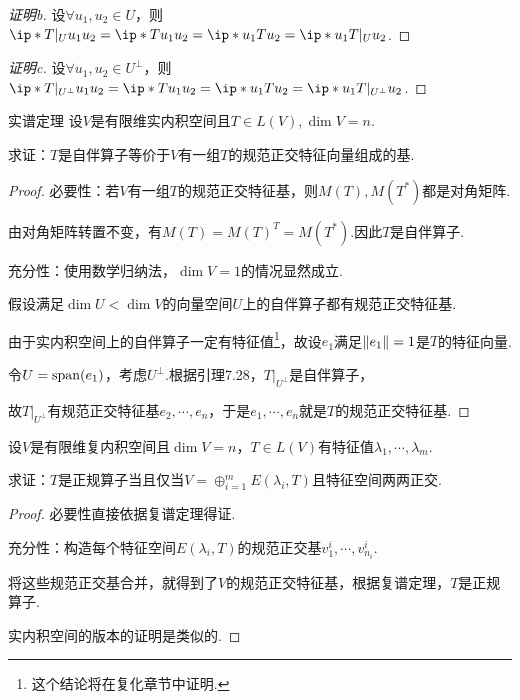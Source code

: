 \begin{proof}[证明b]
    设\(\forall u_1,u_2 \in U\)，则\(\ip*{T|_U u_1}{u_2}=\ip*{Tu_1}{u_2}=\ip*{u_1}{Tu_2}=\ip*{u_1}{T|_U u_2}\).
\end{proof}

\begin{proof}[证明c]
    设\(\forall u_1,u_2 \in U^\bot\)，则\(\ip*{T|_{U^\bot}u_1}{u_2}=\ip*{Tu_1}{u_2}=\ip*{u_1}{Tu_2}=\ip*{u_1}{T|_{U^\bot}u_2}\).
\end{proof}

\begin{theorem}[7.29]\label{thm 7.29} 实谱定理 \:
    设\(V\)是有限维实内积空间且\(T \in L(V),\dim V=n\).

    求证：\(T\)是自伴算子等价于\(V\)有一组\(T\)的规范正交特征向量组成的基.
\end{theorem}

\begin{proof}
    必要性：若\(V\)有一组\(T\)的规范正交特征基，则\(M(T),M(T^*)\)都是对角矩阵.

    由对角矩阵转置不变，有\(M(T)=M(T)^T=M(T^*)\).因此\(T\)是自伴算子.
    
    充分性：使用数学归纳法，\(\dim V=1\)的情况显然成立.
    
    假设满足\(\dim U<\dim V\)的向量空间\(U\)上的自伴算子都有规范正交特征基.
    
    由于实内积空间上的自伴算子一定有特征值\footnote{这个结论将在复化章节中证明.}，故设\(e_1\)满足\(\norm*{e_1}=1\)是\(T\)的特征向量.
    
    令\(U=\altspan(e_1)\)，考虑\(U^\bot\).根据引理7.28，\(T|_{U^\bot}\)是自伴算子，
    
    故\(T|_{U^\bot}\)有规范正交特征基\(e_2,\cdots,e_n\)，于是\(e_1,\cdots,e_n\)就是\(T\)的规范正交特征基.
\end{proof}

\newpage

\begin{problem}[4]\label{7.B.4}
    设\(V\)是有限维复内积空间且\(\dim V=n\)，\(T \in L(V)\)有特征值\(\lambda_1,\cdots,\lambda_m\).

    求证：\(T\)是正规算子当且仅当\(V=\oplus_{i=1}^m E(\lambda_i,T)\)且特征空间两两正交.
\end{problem}

\begin{proof}
    必要性直接依据复谱定理得证.

    充分性：构造每个特征空间\(E(\lambda_i,T)\)的规范正交基\(v_1^i,\cdots,v_{n_i}^i\).
    
    将这些规范正交基合并，就得到了\(V\)的规范正交特征基，根据复谱定理，\(T\)是正规算子.
    
    实内积空间的版本的证明是类似的.
\end{proof}

